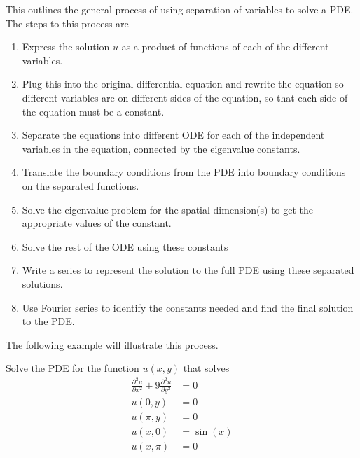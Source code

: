 This outlines the general process of using separation of variables to solve a PDE. The steps to this process are
\begin{enumerate}
\item Express the solution $u$ as a product of functions of each of the different variables.
\item Plug this into the original differential equation and rewrite the equation so different variables are on different sides of the equation, so that each side of the equation must be a constant.
\item Separate the equations into different ODE for each of the independent variables in the equation, connected by the eigenvalue constants.
\item Translate the boundary conditions from the PDE into boundary conditions on the separated functions.
\item Solve the eigenvalue problem for the spatial dimension(s) to get the appropriate values of the constant.
\item Solve the rest of the ODE using these constants
\item Write a series to represent the solution to the full PDE using these separated solutions.
\item Use Fourier series to identify the constants needed and find the final solution to the PDE.
\end{enumerate}

The following example will illustrate this process.

\begin{example} 
Solve the PDE for the function $u(x,y)$ that solves
\[
\begin{split}
\frac{\partial^2 u}{\partial x^2} + 9\frac{\partial^2 u}{\partial y^2} &= 0 \\
u(0, y) &= 0 \\
u(\pi, y) &= 0 \\
u(x, 0) &= \sin(x) \\
u(x, \pi) &= 0 \\
\end{split}
\]
\end{example}

